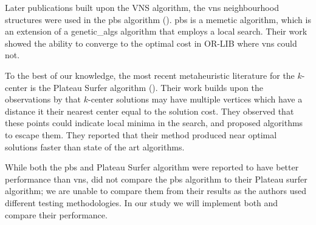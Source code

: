 Later publications built upon the VNS algorithm, the \acrshort{vns} neighbourhood structures were used in the \acrshort{pbs} algorithm (\cite{pullan_memetic_2008}). \acrshort{pbs} is a memetic algorithm, which is an extension of a \gls{genetic_algs} algorithm that employs a local search. Their work showed the ability to converge to the optimal cost in OR-LIB where \acrshort{vns} could not.

To the best of our knowledge, the most recent metaheuristic literature for the $k$-center is the Plateau Surfer algorithm (\cite{battiti_new_2017}). Their work builds upon the observations by \citeauthor{mladenovic_solving_2003} that $k$-center solutions may have multiple vertices which have a distance it their nearest center equal to the solution cost. They observed that these points could indicate local minima in the search, and proposed algorithms to escape them. They reported that their method produced near optimal solutions faster than state of the art algorithms.

While both the \acrshort{pbs} and Plateau Surfer algorithm were reported to have better performance than \acrshort{vns}, \citeauthor{battiti_new_2017} did not compare the \acrshort{pbs} algorithm to their Plateau surfer algorithm; we are unable to compare them from their results as the authors used different testing methodologies. In our study we will implement both and compare their performance.